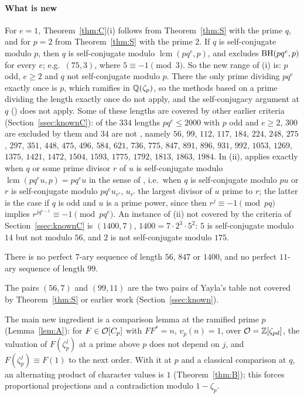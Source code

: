 \paragraph{What is new}
For $e=1$, Theorem~\ref{thm:C}(i) follows from Theorem~\ref{thm:S} with
the prime $q$, and for $p=2$ from Theorem~\ref{thm:S} with the prime $2$.
If $q$ is self-conjugate modulo $p$, then $q$ is self-conjugate modulo
$\operatorname{lcm}(pq^e,p)$, and \cite[Thm.~3.3]{DoDuc2019} excludes
$\operatorname{BH}(pq^e,p)$ for every $e$; e.g.\ $(75,3)$, where $5\equiv-1\pmod3$. So
the new range of (i) is: $p$ odd, $e\ge2$ and $q$ not self-conjugate
modulo $p$. There the only prime dividing $pq^e$ exactly once is $p$,
which ramifies in $\mathbb{Q}(\zeta_p)$, so the methods based on a prime dividing
the length exactly once do not apply, and the self-conjugacy argument
at $q$ (\cite[Thm.~3.3]{DoDuc2019}) does not apply. Some of these lengths are covered by other earlier criteria
(Section~\ref{ssec:knownC}): of the $334$ lengths $pq^e\le2000$ with $p$
odd and $e\ge2$, $300$ are excluded by them and $34$ are not
, namely
$56$, $99$, $112$, $117$, $184$, $224$, $248$, $275$, $297$, $351$,
$448$, $475$, $496$, $584$, $621$, $736$, $775$, $847$, $891$, $896$,
$931$, $992$, $1053$, $1269$, $1375$, $1421$, $1472$, $1504$, $1593$,
$1775$, $1792$, $1813$, $1863$, $1984$.
In (ii), \cite[Thm.~3.3]{DoDuc2019} applies exactly when $q$ or some
prime divisor $r$ of $u$ is self-conjugate modulo
$\operatorname{lcm}(pq^eu,p)=pq^eu$ in the sense of
\cite[Def.~2.5]{DoDuc2019}, i.e.\ when $q$ is self-conjugate modulo $pu$
or $r$ is self-conjugate modulo $pq^eu_{r'}$, $u_{r'}$ the largest
divisor of $u$ prime to $r$; the latter is the case if $q$ is odd and $u$ is a
prime power, since then $r^j\equiv-1\pmod{pq}$ implies
$r^{jq^{e-1}}\equiv-1\pmod{pq^e}$. An instance of (ii) not covered by the
criteria of Section~\ref{ssec:knownC} is $(1400,7)$, $1400=7\cdot2^3\cdot5^2$:
$5$ is self-conjugate modulo $14$ but not modulo $56$, and $2$ is not
self-conjugate modulo $175$.

\begin{corollary}\label{cor:C-new}
There is no perfect $7$-ary sequence of length $56$, $847$ or $1400$,
and no perfect $11$-ary sequence of length $99$.
\end{corollary}

The pairs $(56,7)$ and $(99,11)$ are the two pairs of Yayla's table
\cite{Yayla2016} not covered by Theorem~\ref{thm:S} or earlier work
(Section~\ref{ssec:known}).

The main new ingredient is a comparison lemma at the ramified prime $p$
(Lemma~\ref{lem:A}): for $F\in\mathcal{O}[C_p]$ with $FF^*=n$, $v_p(n)=1$, over
$\mathcal{O}=\mathbb{Z}[\zeta_{pd}]$, the valuation of $F(\zeta_p^j)$ at a prime above
$p$ does not depend on $j$, and $F(\zeta_p^j)\equiv F(1)$ to the next
order. With it at $p$ and a classical comparison at $q$, an alternating
product of character values is $1$ (Theorem~\ref{thm:B}); this forces
proportional projections and a contradiction modulo $1-\zeta_p$.

